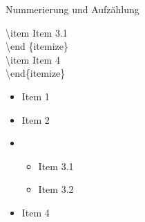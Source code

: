 \begin{frame}[fragile]{Nummerierung und Aufz\"ahlung}
\begin{multicols}{2}
\begin{tabbing}
\>\>\>\color{cred}\textbackslash item \color{black}Item 3.1\\
\>\>\color{cturkis}\textbackslash end \color{black}\{\color{cpurple}itemize\color{black}\}\\
\>\color{cred}\textbackslash item \color{black}Item 4\\
\color{cturkis}\textbackslash end\{\color{cpurple}itemize\color{black}\}\\
\end{tabbing}
\normalsize
\begin{itemize}
    \item Item 1
    \item Item 2
    \item \begin{itemize}
            \item Item 3.1
            \item Item 3.2
          \end{itemize}
    \item Item 4
\end{itemize}
\end{multicols}
\end{frame}
